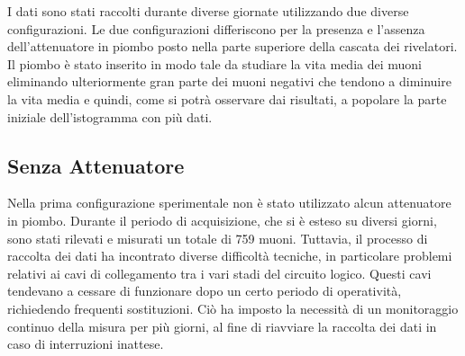 I dati sono stati raccolti durante diverse giornate utilizzando due diverse configurazioni. Le due configurazioni differiscono per la presenza e l'assenza dell'attenuatore in piombo posto nella parte superiore della cascata dei rivelatori. Il piombo è stato inserito in modo tale da studiare la vita media dei muoni eliminando ulteriormente gran parte dei muoni negativi che tendono a diminuire la vita media e quindi, come si potrà osservare dai risultati, a popolare la parte iniziale dell'istogramma con più dati.
\subsection{Senza Attenuatore}
Nella prima configurazione sperimentale non è stato utilizzato alcun attenuatore in piombo. Durante il periodo di acquisizione, che si è esteso su diversi giorni, sono stati rilevati e misurati un totale di 759 muoni. Tuttavia, il processo di raccolta dei dati ha incontrato diverse difficoltà tecniche, in particolare problemi relativi ai cavi di collegamento tra i vari stadi del circuito logico. Questi cavi tendevano a cessare di funzionare dopo un certo periodo di operatività, richiedendo frequenti sostituzioni. Ciò ha imposto la necessità di un monitoraggio continuo della misura per più giorni, al fine di riavviare la raccolta dei dati in caso di interruzioni inattese. 

